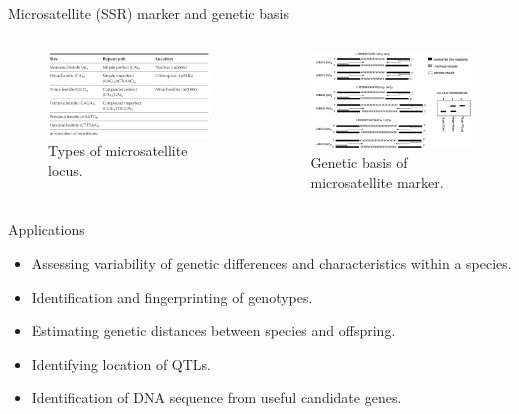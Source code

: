 \documentclass[
  ignorenonframetext,
  aspectratio=169]{beamer}
\providecommand{\tightlist}{%
  \setlength{\itemsep}{0pt}\setlength{\parskip}{0pt}}
\newcommand{\bcolumns}{\begin{columns}[T, onlytextwidth]}
\newcommand{\ecolumns}{\end{columns}}
\begin{document}
\begin{frame}{Microsatellite (SSR) marker and genetic basis}
\protect\hypertarget{microsatellite-ssr-marker-and-genetic-basis}{}
\bcolumns
{}

\begin{figure}
\includegraphics[width=0.95\linewidth]{../images/SSR_class} \caption{Types of microsatellite locus.}\label{fig:microsatellite-marker-classification}
\end{figure}


\begin{figure}
\includegraphics[width=0.98\linewidth]{../images/SSR_marker_genetic_basis} \caption{Genetic basis of microsatellite marker.}\label{fig:microsatellite-marker-basis}
\end{figure}

\ecolumns
\end{frame}

\begin{frame}{Applications}
\protect\hypertarget{applications}{}
\begin{itemize}
\tightlist
\item
  Assessing variability of genetic differences and characteristics
  within a species.
\item
  Identification and fingerprinting of genotypes.
\item
  Estimating genetic distances between species and offspring.
\item
  Identifying location of QTLs.
\item
  Identification of DNA sequence from useful candidate genes.
\end{itemize}
\end{frame}
\end{document}
